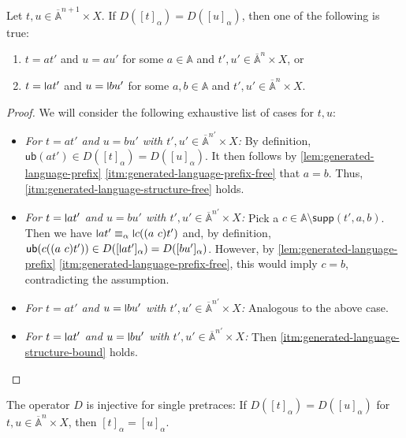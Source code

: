 \documentclass[a4paper,UKenglish,cleveref,thm-restate,numberwithinsect,final]{lipics-v2021}
\newcommand{\Names}{\mathbb{A}}
\newcommand{\barNames}{\overline{\Names}}
\newcommand{\alphaeq}{\equiv_\alpha}
\newcommand{\supp}{\mathsf{supp}}
\theoremstyle{plain}
\newcommand{\midmid}{\hspace{0.2ex}{\rule[-0.1ex]{0.6pt}{1.65ex}}\hspace{0.2ex}}
\newcommand{\newletter}[1]{{\midmid}#1}
\newcommand{\ub}{\mathsf{ub}}
\numberwithin{equation}{section}
\newcommand{\+}[1]{\mathcal{#1}\xspace}
\theoremstyle{definition}
\begin{document}
\begin{lemma}\label{lem:generated-language-structure}
  Let \(t, u \in \barNames^{n + 1} \times X\).
  If \(D([t]_\alpha) = D([u]_\alpha)\), then one of the following is true:
  \begin{enumerate}
    \item \label{itm:generated-language-structure-free}
      \(t = at'\) and \(u = au'\) for some \(a \in \Names\) and \(t', u' \in \barNames^n \times X\), or
    \item \label{itm:generated-language-structure-bound}
      \(t = \newletter{a}t'\) and \(u = \newletter{b}u'\) for some \(a, b \in \Names\) and \(t', u' \in \barNames^n \times X\).
  \end{enumerate}
\end{lemma}

\begin{proof}
  We will consider the following exhaustive list of cases for \(t, u\):
  \begin{itemize}
    \item \emph{For \(t = at'\) and \(u = bu'\) with \(t', u' \in \barNames^{n'} \times X\):}
      By definition, \(\ub(at') \in D([t]_\alpha) = D([u]_\alpha)\).
      It then follows by \cref{lem:generated-language-prefix} \eqref{itm:generated-language-prefix-free} that \(a = b\).
      Thus, \eqref{itm:generated-language-structure-free} holds.
    \item \textit{For \(t = \newletter{a}t'\) and \(u = bu'\) with \(t', u' \in \barNames^{n'} \times X\):}
      Pick a \(c \in \Names \setminus \supp(t', a, b)\).
      Then we have \(\newletter{a}t' \alphaeq \newletter{c} ((a\ c)t')\) and, by definition, \(\ub(c((a\ c)t')) \in D([\newletter{a}t']_\alpha) = D([bu']_\alpha)\).
      However, by \cref{lem:generated-language-prefix} \eqref{itm:generated-language-prefix-free}, this would imply \(c = b\), contradicting the assumption.
    \item \textit{For \(t = at'\) and \(u = \newletter{b}u'\) with \(t', u' \in \barNames^{n'} \times X\):}
      Analogous to the above case.
    \item \textit{For \(t = \newletter{a}t'\) and \(u = \newletter{b}u'\) with \(t', u' \in \barNames^{n'} \times X\):}
      Then \eqref{itm:generated-language-structure-bound} holds.
  \end{itemize}
\end{proof}

\begin{lemma}\label{lem:generated-language-injectivity}
  The operator \(D\) is injective for single pretraces: If \(D([t]_\alpha) = D([u]_\alpha)\) for \(t, u \in \barNames^n \times X\), then \([t]_\alpha = [u]_\alpha\).
\end{lemma}
\end{document}
